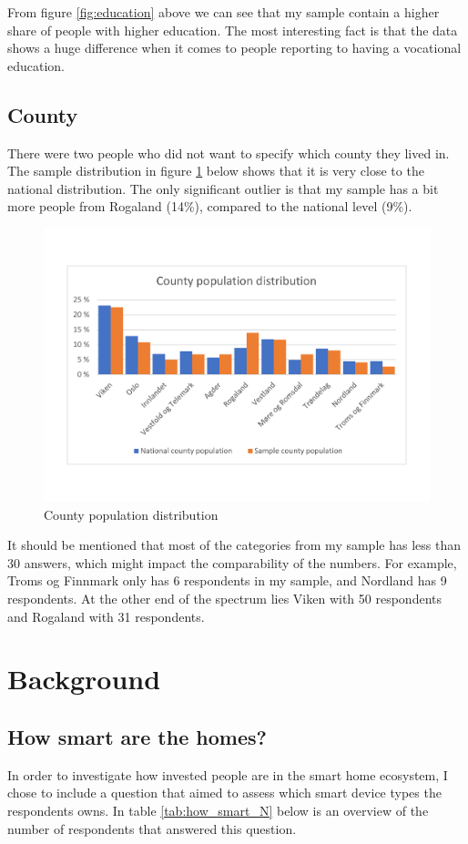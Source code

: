 From figure \ref{fig:education} above we can see that my sample contain a higher share of people with higher education. The most interesting fact is that the data shows a huge difference when it comes to people reporting to having a vocational education. 

\subsection{County}
There were two people who did not want to specify which county they lived in. The sample distribution in figure \ref{fig:county} below shows that it is very close to the national distribution. The only significant outlier is that my sample has a bit more people from Rogaland (14\%), compared to the national level (9\%).
\begin{figure}[!h]
    \centering
    \includegraphics[scale=0.45]{figures/diagrams/county_ssb.pdf}
    \caption{County population distribution}
    \label{fig:county}
\end{figure}

It should be mentioned that most of the categories from my sample has less than 30 answers, which might impact the comparability of the numbers. For example, Troms og Finnmark only has 6 respondents in my sample, and Nordland has 9 respondents. At the other end of the spectrum lies Viken with 50 respondents and Rogaland with 31 respondents. 

\section{Background}

\subsection{How smart are the homes?}
In order to investigate how invested people are in the smart home ecosystem, I chose to include a question that aimed to assess which smart device types the respondents owns. In table \ref{tab:how_smart_N} below is an overview of the number of respondents that answered this question. 


